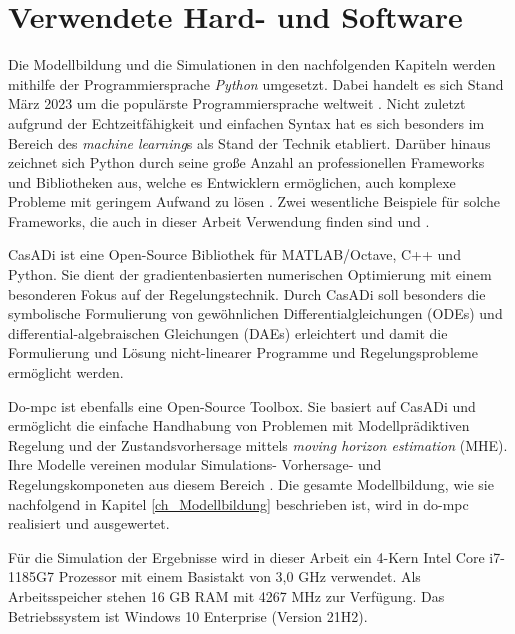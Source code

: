 \section{Verwendete Hard- und Software} \label{sec_HardSoftware}
Die Modellbildung und die Simulationen in den nachfolgenden Kapiteln werden mithilfe der Programmiersprache \textit{Python} umgesetzt.
Dabei handelt es sich Stand März 2023 um die populärste Programmiersprache weltweit \cite{Statista}.
Nicht zuletzt aufgrund der Echtzeitfähigkeit \cite[S.9]{Python} und einfachen Syntax hat es sich besonders im Bereich des \textit{machine learning}s als Stand der Technik etabliert.
Darüber hinaus zeichnet sich Python durch seine große Anzahl an professionellen Frameworks und Bibliotheken aus, welche es Entwicklern ermöglichen, auch komplexe Probleme mit geringem Aufwand zu lösen \cite[S.3]{Python}.
Zwei wesentliche Beispiele für solche Frameworks, die auch in dieser Arbeit Verwendung finden sind  und .

CasADi ist eine Open-Source Bibliothek für MATLAB/Octave, C++ und Python.
Sie dient der gradientenbasierten numerischen Optimierung mit einem besonderen Fokus auf der Regelungstechnik.
Durch CasADi soll besonders die symbolische Formulierung von gewöhnlichen Differentialgleichungen (ODEs) und differential-algebraischen Gleichungen (DAEs) erleichtert und damit die Formulierung und Lösung nicht-linearer Programme und Regelungsprobleme ermöglicht werden. \cite{Casadi}

Do-mpc ist ebenfalls eine Open-Source Toolbox.
Sie basiert auf CasADi und ermöglicht die einfache Handhabung von Problemen mit Modellprädiktiven Regelung und der Zustandsvorhersage mittels \textit{moving horizon estimation} (MHE).
Ihre Modelle vereinen modular Simulations- Vorhersage- und Regelungskomponeten aus diesem Bereich \cite{Dompc2}.
Die gesamte Modellbildung, wie sie nachfolgend in Kapitel \ref{ch_Modellbildung} beschrieben ist, wird in do-mpc realisiert und ausgewertet.

Für die Simulation der Ergebnisse wird in dieser Arbeit ein 4-Kern Intel Core i7-1185G7 Prozessor mit einem Basistakt von 3,0 GHz verwendet.
Als Arbeitsspeicher stehen 16 GB RAM mit 4267 MHz zur Verfügung.
Das Betriebssystem ist Windows 10 Enterprise (Version 21H2).
